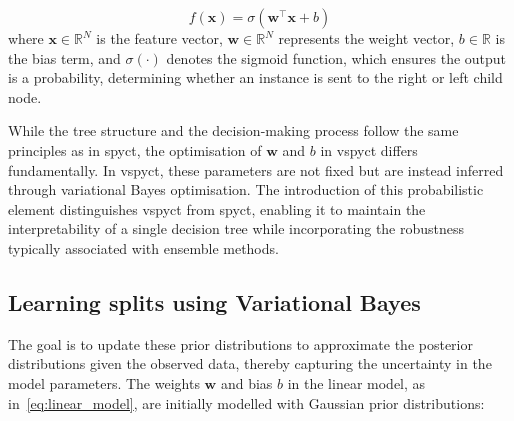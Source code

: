 \documentclass[3p,review,authoryear]{elsarticle}
\begin{document}
\begin{equation}
f(\mathbf{x}) = \sigma \left(\mathbf{w}^\top \mathbf{x} + b \right)
\label{eq:linear_model}
\end{equation}
where \(\mathbf{x} \in \mathbb{R}^N\) is the feature vector, \(\mathbf{w} \in \mathbb{R}^N\) represents the weight vector, \(b \in \mathbb{R}\) is the bias term, and \(\sigma(\cdot)\) denotes the sigmoid function, which ensures the output is a probability, determining whether an instance is sent to the right or left child node.

While the tree structure and the decision-making process follow the same principles as in \gls{spyct}, the optimisation of \(\mathbf{w}\) and \(b\) in \gls{vspyct} differs fundamentally.
In \gls{vspyct}, these parameters are not fixed but are instead inferred through variational Bayes optimisation.
The introduction of this probabilistic element distinguishes \gls{vspyct} from \gls{spyct}, enabling it to maintain the interpretability of a single decision tree while incorporating the robustness typically associated with ensemble methods.

\subsection{Learning splits using Variational Bayes}


The goal is to update these prior distributions to approximate the posterior distributions given the observed data, thereby capturing the uncertainty in the model parameters.
The weights \(\mathbf{w}\) and bias \(b\) in the linear model, as in~\eqref{eq:linear_model}, are initially modelled with Gaussian prior distributions:
\end{document}
